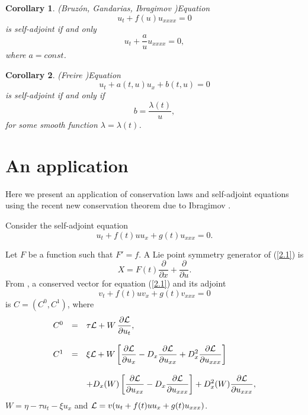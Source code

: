 \documentclass[11pt,letterpaper,twoside]{article}
\newcommand{\f}{\frac}
\newcommand{\ds}{\displaystyle }
\newtheorem{corollary}{Corollary}
\newcommand{\p}{\partial}
\newcommand{\bb}{\begin{equation}}
\newcommand{\ee}{\end{equation}}
\newcommand{\ba}{\begin{array}}
\newcommand{\ea}{\end{array}}
\begin{document}
\begin{corollary}(Bruzón, Gandarias, Ibragimov \cite{ib1})\label{cor3} Equation
$$
u_{t}+f(u)u_{xxxx}=0
$$
is self-adjoint if and only
\bb\label{1.9}
u_{t}+\f{a}{u}u_{xxxx}=0,
\ee
where $a=const$.
\end{corollary}


\begin{corollary}(Freire \cite{ijnmp})\label{cor4}
Equation
\bb\label{1.8}u_{t}+a(t,u)u_{x}+b(t,u)=0\ee
is self-adjoint if and only if
$$b=\f{\lambda(t)}{u},$$
for some smooth function $\lambda=\lambda(t)$. 
\end{corollary}


\section{An application}

Here we present an application of conservation laws and self-adjoint equations using the recent new conservation theorem due to Ibragimov \cite{ib2}. %



Consider the self-adjoint equation
\bb\label{2.1}
u_{t}+f(t)uu_{x}+g(t)u_{xxx}=0.
\ee

Let $F$ be a function such that $F'=f$. A Lie point symmetry generator of (\ref{2.1}) is
\bb\label{2.2}
X=F(t)\f{\p}{\p x}+\f{\p}{\p u}.
\ee
From \cite{ib2}, a conserved vector for equation (\ref{2.1}) and its adjoint
\bb\label{2.2'} 
v_{t}+f(t)uv_{x}+g(t)v_{xxx}=0
\ee
is $C=(C^{0},C^{1})$, where
\bb\label{2.3}
\ba{lcl}
C^{0}&=&\ds{\tau {\cal L}+W\,\f{\p {\cal L}}{\p u_{t}}},\\
\\
C^{1}&=&\ds{\xi {\cal L}+W\left[\f{\p {\cal L}}{\p u_{x}}-D_{x}\f{\p {\cal L}}{\p u_{xx}}+D_{x}^{2}\f{\p {\cal L}}{\p u_{xxx}}\right]}\\
\\
&&\ds{+D_{x}(W)\left[\f{\p {\cal L}}{\p u_{xx}}-D_{x}\f{\p {\cal L}}{\p u_{xxx}}\right]+D_{x}^{2}(W)\f{\p {\cal L}}{\p u_{xxx}}},
\ea
\ee
$W=\eta-\tau u_{t}-\xi u_{x}$ and ${\cal L}=v(u_{t}+f(t)uu_{x}+g(t)u_{xxx})$.
\end{document}
